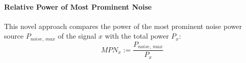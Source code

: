 \paragraph{Relative Power of Most Prominent Noise}
This novel approach compares the power of the most prominent noise power source $P_{noise,\,max}$ of the signal $x$ with the total power $P_x$:
\begin{equation}
MPN_x := \frac{P_{noise,\,max}}{P_x}
\end{equation}



